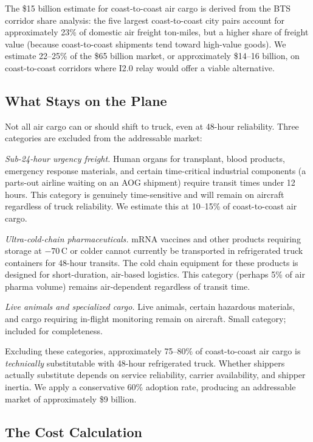 The \$15 billion estimate for coast-to-coast air cargo is derived from the BTS corridor
share analysis: the five largest coast-to-coast city pairs account for approximately
23\% of domestic air freight ton-miles, but a higher share of freight value (because
coast-to-coast shipments tend toward high-value goods). We estimate 22--25\% of the
\$65 billion market, or approximately \$14--16 billion, on coast-to-coast corridors
where I2.0 relay would offer a viable alternative.

\subsection{What Stays on the Plane}

Not all air cargo can or should shift to truck, even at 48-hour reliability.
Three categories are excluded from the addressable market:

\textit{Sub-24-hour urgency freight.} Human organs for transplant, blood products,
emergency response materials, and certain time-critical industrial components
(a parts-out airline waiting on an AOG shipment) require transit times under 12 hours.
This category is genuinely time-sensitive and will remain on aircraft regardless of
truck reliability. We estimate this at 10--15\% of coast-to-coast air cargo.

\textit{Ultra-cold-chain pharmaceuticals.} mRNA vaccines and other products requiring
storage at $-70$\,\textdegree C or colder cannot currently be transported in refrigerated
truck containers for 48-hour transits. The cold chain equipment for these products is
designed for short-duration, air-based logistics. This category (perhaps 5\% of air pharma
volume) remains air-dependent regardless of transit time.

\textit{Live animals and specialized cargo.} Live animals, certain hazardous materials,
and cargo requiring in-flight monitoring remain on aircraft. Small category; included
for completeness.

Excluding these categories, approximately 75--80\% of coast-to-coast air cargo is
\textit{technically} substitutable with 48-hour refrigerated truck. Whether shippers
actually substitute depends on service reliability, carrier availability, and shipper
inertia. We apply a conservative 60\% adoption rate, producing an addressable market
of approximately \$9 billion.

\subsection{The Cost Calculation}

